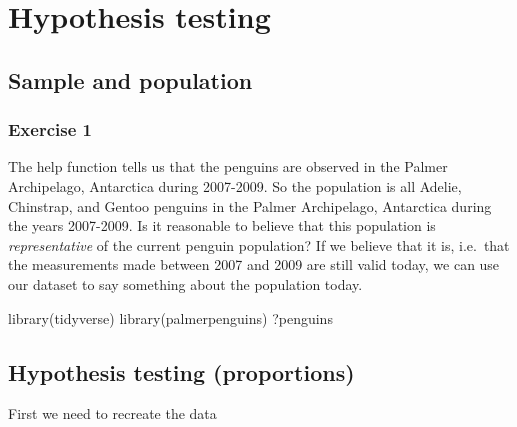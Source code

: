 \documentclass[
  letterpaper,
  DIV=11,
  numbers=noendperiod]{scrreprt}
\newenvironment{Shaded}{\begin{snugshade}}{\end{snugshade}}
\newcommand{\FunctionTok}[1]{\textcolor[rgb]{0.28,0.35,0.67}{#1}}
\newcommand{\NormalTok}[1]{\textcolor[rgb]{0.00,0.23,0.31}{#1}}
\begin{document}
\chapter{Hypothesis testing}\label{hypothesis-testing}

\section{Sample and population}\label{sample-and-population-1}

\subsection{Exercise 1}\label{exercise-1-19}

The help function tells us that the penguins are observed in the Palmer
Archipelago, Antarctica during 2007-2009. So the population is all
Adelie, Chinstrap, and Gentoo penguins in the Palmer Archipelago,
Antarctica during the years 2007-2009. Is it reasonable to believe that
this population is \emph{representative} of the current penguin
population? If we believe that it is, i.e.~that the measurements made
between 2007 and 2009 are still valid today, we can use our dataset to
say something about the population today.

\begin{Shaded}
\begin{Highlighting}[]
\FunctionTok{library}\NormalTok{(tidyverse)}
\FunctionTok{library}\NormalTok{(palmerpenguins)}
\NormalTok{?penguins}
\end{Highlighting}
\end{Shaded}

\section{Hypothesis testing
(proportions)}\label{hypothesis-testing-proportions-1}

First we need to recreate the data
\end{document}
